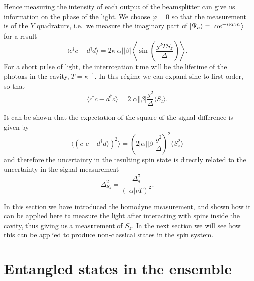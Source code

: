 Hence measuring the intensity of each output of the beamsplitter can give us
information on the phase of the light. We choose $\varphi = 0$ so that the
measurement is of the $Y$ quadrature, i.e.\ we measure the imaginary part of
$\ket{\Psi_a} = \ket{\alpha e^{-i\nu Tm}}$ for a result
%
\begin{equation}
  \langle c^\dagger c - d^\dagger d\rangle =  2\kappa
  |\alpha||\beta|\left\langle\sin(\frac{g^2 T S_z}{\Delta})\right\rangle.
\end{equation}
%
For a short pulse of light, the interrogation time will be the lifetime of the
photons in the cavity, $T = \kappa^{-1}$. In this r\'egime we can expand sine
to first order, so that
%
\begin{equation}
  \langle c^\dagger c - d^\dagger d\rangle = 2|\alpha||\beta|
  \frac{g^2}{\Delta}\langle S_z\rangle.
  \label{eqn:homomeas}
\end{equation}

It can be shown that the expectation of the square of the signal difference
is given by 
%
\begin{equation}
  \langle (c^\dagger c - d^\dagger d\rangle)^2 \rangle = (2|\alpha||\beta|
  \frac{g^2}{\Delta})^2\langle S_z^2\rangle
\end{equation}
%
and therefore the uncertainty in the resulting spin state is directly
related to the uncertainty in the signal measurement
%
\begin{equation}
  \Delta_{S_z}^2 = \frac{\Delta_\eta^2}{(|\alpha|\nu T)^2}.
\end{equation}

In this section we have introduced the homodyne measurement, and shown how it
can be applied here to measure the light after interacting with spins inside
the cavity, thus giving us a measurement of $S_z$. In the next section we will
see how this can be applied to produce non-classical states in the spin system.

\section{Entangled states in the ensemble}



